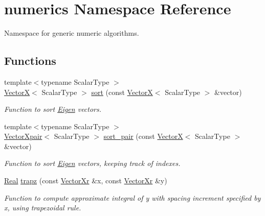 \hypertarget{namespacenumerics}{\section{numerics Namespace Reference}
\label{namespacenumerics}
}


Namespace for generic numeric algorithms.  


\subsection*{Functions}
\begin{DoxyCompactItemize}
\item 
{\footnotesize template$<$typename Scalar\-Type $>$ }\\\hyperlink{typedefs_8h_ac264e7346c0c88c8a573518d1e8f8c3d}{Vector\-X}$<$ Scalar\-Type $>$ \hyperlink{namespacenumerics_a1633aabded7159bb15bbf573bf9e12c5}{sort} (const \hyperlink{typedefs_8h_ac264e7346c0c88c8a573518d1e8f8c3d}{Vector\-X}$<$ Scalar\-Type $>$ \&vector)
\begin{DoxyCompactList}\small\item\em Function to sort \hyperlink{index_Eigen}{Eigen} vectors. \end{DoxyCompactList}\item 
{\footnotesize template$<$typename Scalar\-Type $>$ }\\\hyperlink{typedefs_8h_af38b14e4434227fa8e1b41e0d6632171}{Vector\-Xpair}$<$ Scalar\-Type $>$ \hyperlink{namespacenumerics_a510fe73118ce8c79570ac87fa3e7df47}{sort\-\_\-pair} (const \hyperlink{typedefs_8h_ac264e7346c0c88c8a573518d1e8f8c3d}{Vector\-X}$<$ Scalar\-Type $>$ \&vector)
\begin{DoxyCompactList}\small\item\em Function to sort \hyperlink{index_Eigen}{Eigen} vectors, keeping track of indexes. \end{DoxyCompactList}\item 
\hyperlink{typedefs_8h_a060b837c3b4486ee35317744156f3da2}{Real} \hyperlink{namespacenumerics_a41daad9dd743c914a195298bda0c0269}{trapz} (const \hyperlink{typedefs_8h_aae6cee78ed9cd8f234ed8cb48682548a}{Vector\-Xr} \&x, const \hyperlink{typedefs_8h_aae6cee78ed9cd8f234ed8cb48682548a}{Vector\-Xr} \&y)
\begin{DoxyCompactList}\small\item\em Function to compute approximate integral of {\itshape y} with spacing increment specified by {\itshape x}, using trapezoidal rule. \end{DoxyCompactList}\item 

\end{DoxyCompactItemize}
